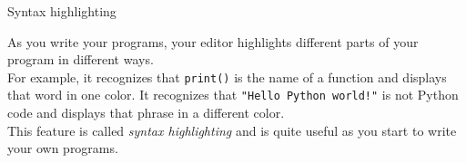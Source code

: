 \documentclass[aspectratio=169]{beamer}
\begin{document}
\begin{frame}{Syntax highlighting}
 
    As you write your programs, your editor highlights different parts of your program in different ways. \\
    \vspace{15pt}
    For example, it recognizes that \texttt{print()} is the name of a function and displays that word in one color.
    \vspace{15pt}
    It recognizes that \texttt{"Hello Python world!"} is not Python code and displays that phrase in a different color. \\
    \vspace{15pt}
    This feature is called \textit{syntax highlighting} and is quite useful as you start to write your own programs.
\end{frame}
\end{document}

